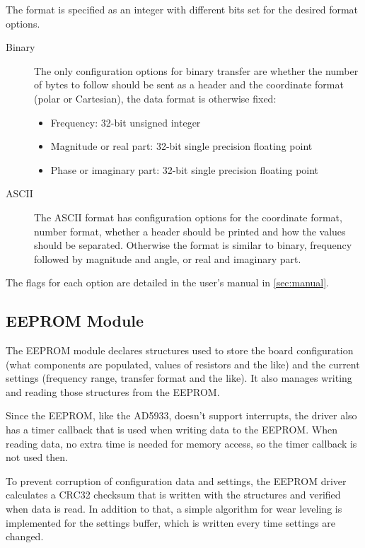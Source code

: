 The format is specified as an integer with different bits set for the desired format options.
%
\begin{description}
  \item[Binary] The only configuration options for binary transfer are whether the number of bytes to follow should
    be sent as a header and the coordinate format (polar or Cartesian), the data format is otherwise fixed:
    \begin{itemize}
      \item Frequency: 32-bit unsigned integer
      \item Magnitude or real part: 32-bit single precision floating point
      \item Phase or imaginary part: 32-bit single precision floating point
    \end{itemize}
  
  \item[ASCII] The ASCII format has configuration options for the coordinate format, number format, whether a header
    should be printed and how the values should be separated. Otherwise the format is similar to binary, frequency
    followed by magnitude and angle, or real and imaginary part.
\end{description}

The flags for each option are detailed in the user's manual in \autoref{sec:manual}.


\subsection{EEPROM Module}

The EEPROM module declares structures used to store the board configuration (what components are populated, values of
resistors and the like) and the current settings (frequency range, transfer format and the like). It also manages
writing and reading those structures from the EEPROM.

Since the EEPROM, like the AD5933, doesn't support interrupts, the driver also has a timer callback that is used when
writing data to the EEPROM. When reading data, no extra time is needed for memory access, so the timer callback is not
used then.

To prevent corruption of configuration data and settings, the EEPROM driver calculates a CRC32 checksum that is written
with the structures and verified when data is read. In addition to that, a simple algorithm for wear leveling\footnotemark{}
is implemented for the settings buffer, which is written every time settings are changed.

